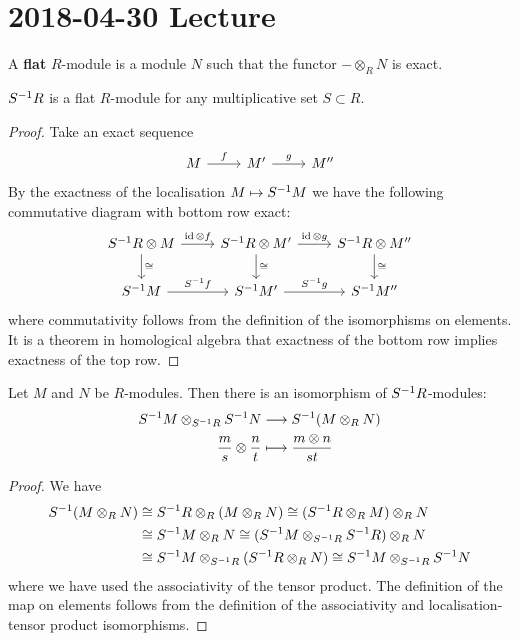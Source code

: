 \section{2018-04-30 Lecture}

\begin{defn}
  A \textbf{flat} $R$-module is a module $N$ such that the functor $-\otimes_R N$ is exact.
\end{defn}

\begin{cor}[2.10]
  $S^{-1} R$ is a flat $R$-module for any multiplicative set $S \subset R$.
\end{cor}

\begin{proof}
  Take an exact sequence
  \begin{equation*}
    \begin{tikzcd}
      M \ar[r, "f"] & M' \ar[r, "g"] & M''
    \end{tikzcd}
  \end{equation*}
  By the exactness of the localisation $M \mapsto S^{-1} M$ we have the following commutative diagram with bottom row exact:
  \begin{equation*}
    \begin{tikzcd}
      S\inv R \otimes M \ar[r, "\id \otimes f"] \ar[d, "\cong"] & S\inv R \otimes M' \ar[r, "\id \otimes g"] \ar[d, "\cong"] & S\inv R \otimes M'' \ar[d, "\cong"] \\
      S\inv M \ar[r, "S\inv f"] & S\inv M' \ar[r, "S\inv g"] & S\inv M''
    \end{tikzcd}
  \end{equation*}
  where commutativity follows from the definition of the isomorphisms on elements.
  It is a theorem in homological algebra that exactness of the bottom row implies exactness of the top row.
\end{proof}

\begin{prop}[2.11]
  Let $M$ and $N$ be $R$-modules.
  Then there is an isomorphism of $S^{-1} R$-modules:
  \begin{align*}
    S^{-1} M \otimes_{S^{-1} R} S^{-1} N &\longrightarrow S^{-1}(M \otimes_R N) \\
    \frac ms \otimes \frac nt &\longmapsto \frac{m \otimes n}{st}
  \end{align*}
\end{prop}

\begin{proof}
  We have
  \begin{align*}
    S^{-1} (M \otimes_R N) &\cong S^{-1} R \otimes_R (M \otimes_R N) \cong (S^{-1} R \otimes_R M) \otimes_R N \\
    &\cong S^{-1} M \otimes_R N \cong (S^{-1} M \otimes_{S^{-1} R} S^{-1} R) \otimes_R N \\
    &\cong S^{-1} M \otimes_{S^{-1} R} (S^{-1} R \otimes_R N) \cong S^{-1} M \otimes_{S^{-1} R} S^{-1} N
  \end{align*}
  where we have used the associativity of the tensor product.
  The definition of the map on elements follows from the definition of the associativity and localisation-tensor product isomorphisms.
\end{proof}

